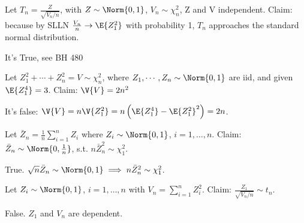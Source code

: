 \documentclass[tf-tutorial-all.tex]{subfiles}
\begin{document}
\begin{truefalse}
Let $T_n = \frac{Z}{\sqrt{V_n/n}}$, with $Z\sim \Norm{0,1}$, $V_n\sim \chi_n^2$, Z and V independent.
Claim: because by SLLN $\frac{V_n}{n}\rightarrow \E{Z_1^2}$ with probability 1, $T_n$ approaches the standard normal distribution.
\begin{solution}
It's True, see BH 480
\end{solution}
\end{truefalse}

\begin{truefalse}
Let $Z_1^2 + \cdots + Z_n^2 = V \sim \chi^2_n$, where $Z_1, \cdots ,Z_n \sim \Norm{0,1}$ are iid,
and given $\E{Z_1^4} = 3$.
Claim: $\V{V} = 2n^2$
\begin{solution}
It's false: $\V{V} = n\V{Z_1^2} = n\left(\E{Z_1^4} - \E{Z_1^2}^2\right) = 2n$.
\end{solution}
\end{truefalse}

\begin{truefalse}
Let $\bar{Z}_n=\frac{1}{n}\sum_{i=1}^nZ_i$ where $Z_i\sim\Norm{0,1}$, $i=1,\dots,n$. Claim: $\bar{Z}_n\sim\Norm{0,\frac{1}{n}}$, s.t. $n\bar{Z}_n^2\sim\chi^2_1$.

\begin{solution}
True. $\sqrt{n}\bar{Z}_n\sim\Norm{0,1}\implies n\bar{Z}_n^2\sim\chi^2_1$.
\end{solution}
\end{truefalse}

\begin{truefalse}
Let $Z_i \sim \Norm{0,1}$, $i=1,\dots,n$ with $V_n=\sum_{i=1}^nZ_i^2$. Claim: $\frac{Z_1}{\sqrt{V_n/n}} \sim t_n$.

\begin{solution}
False. $Z_1$ and $V_n$ are dependent.
\end{solution}
\end{truefalse}
\end{document}
